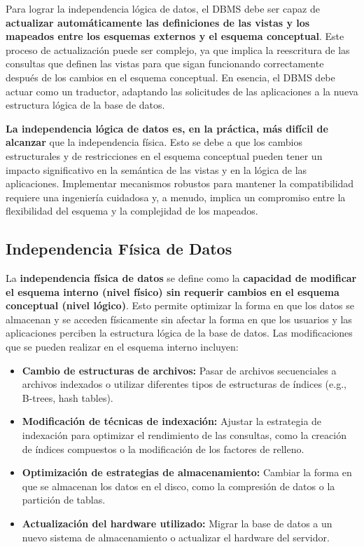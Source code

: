 Para lograr la independencia lógica de datos, el DBMS debe ser capaz de \textbf{actualizar automáticamente las definiciones de las vistas y los mapeados entre los esquemas externos y el esquema conceptual}.  Este proceso de actualización puede ser complejo, ya que implica la reescritura de las consultas que definen las vistas para que sigan funcionando correctamente después de los cambios en el esquema conceptual.  En esencia, el DBMS debe actuar como un traductor, adaptando las solicitudes de las aplicaciones a la nueva estructura lógica de la base de datos.

\textbf{La independencia lógica de datos es, en la práctica, más difícil de alcanzar} que la independencia física.  Esto se debe a que los cambios estructurales y de restricciones en el esquema conceptual pueden tener un impacto significativo en la semántica de las vistas y en la lógica de las aplicaciones.  Implementar mecanismos robustos para mantener la compatibilidad requiere una ingeniería cuidadosa y, a menudo, implica un compromiso entre la flexibilidad del esquema y la complejidad de los mapeados.

\subsection{Independencia Física de Datos}

La \textbf{independencia física de datos} se define como la \textbf{capacidad de modificar el esquema interno (nivel físico) sin requerir cambios en el esquema conceptual (nivel lógico)}.  Esto permite optimizar la forma en que los datos se almacenan y se acceden físicamente sin afectar la forma en que los usuarios y las aplicaciones perciben la estructura lógica de la base de datos.  Las modificaciones que se pueden realizar en el esquema interno incluyen:

\begin{itemize}
    \item \textbf{Cambio de estructuras de archivos:} Pasar de archivos secuenciales a archivos indexados o utilizar diferentes tipos de estructuras de índices (e.g., B-trees, hash tables).
    \item \textbf{Modificación de técnicas de indexación:} Ajustar la estrategia de indexación para optimizar el rendimiento de las consultas, como la creación de índices compuestos o la modificación de los factores de relleno.
    \item \textbf{Optimización de estrategias de almacenamiento:} Cambiar la forma en que se almacenan los datos en el disco, como la compresión de datos o la partición de tablas.
    \item \textbf{Actualización del hardware utilizado:} Migrar la base de datos a un nuevo sistema de almacenamiento o actualizar el hardware del servidor.
\end{itemize}

